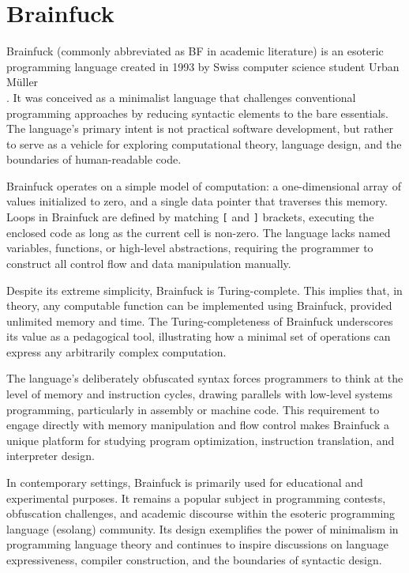 \clearpage

\chapter{Brainfuck}
\label{chap:ch2}

\par Brainfuck (commonly abbreviated as BF in academic literature) is an esoteric programming language created in 1993 by Swiss computer science student Urban Müller\\\cite{BFWiki}. It was conceived as a minimalist language that challenges conventional programming approaches by reducing syntactic elements to the bare essentials. The language's primary intent is not practical software development, but rather to serve as a vehicle for exploring computational theory, language design, and the boundaries of human-readable code.

\par Brainfuck operates on a simple model of computation: a one-dimensional array of values initialized to zero, and a single data pointer that traverses this memory. Loops in Brainfuck are defined by matching \texttt{[} and \texttt{]} brackets, executing the enclosed code as long as the current cell is non-zero. The language lacks named variables, functions, or high-level abstractions, requiring the programmer to construct all control flow and data manipulation manually.

\par Despite its extreme simplicity, Brainfuck is Turing-complete. This implies that, in theory, any computable function can be implemented using Brainfuck, provided unlimited memory and time. The Turing-completeness of Brainfuck underscores its value as a pedagogical tool, illustrating how a minimal set of operations can express any arbitrarily complex computation.

\par The language's deliberately obfuscated syntax forces programmers to think at the level of memory and instruction cycles, drawing parallels with low-level systems programming, particularly in assembly or machine code. This requirement to engage directly with memory manipulation and flow control makes Brainfuck a unique platform for studying program optimization, instruction translation, and interpreter design.

\par In contemporary settings, Brainfuck is primarily used for educational and experimental purposes. It remains a popular subject in programming contests, obfuscation challenges, and academic discourse within the esoteric programming language (esolang) community. Its design exemplifies the power of minimalism in programming language theory and continues to inspire discussions on language expressiveness, compiler construction, and the boundaries of syntactic design.

